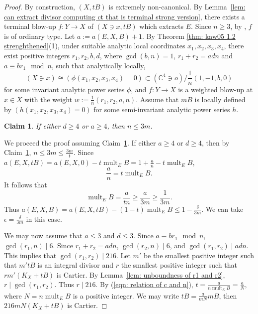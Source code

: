 \documentclass[11pt]{amsart}
\numberwithin{equation}{section}
\newcommand{\mult}{\operatorname{mult}}
\newtheorem{claim}[thm]{Claim}
\theoremstyle{definition}
\theoremstyle{definition}
\begin{document}
\begin{proof}
By construction, $(X,tB)$ is extremely non-canonical. By Lemma~\ref{lem: can extract divisor computing ct that is terminal strong version}, there exists a terminal blow-up $f: Y\to X$ of $(X\ni x,tB)$ which extracts $E$. Since $n\geq 3$, by \cite[Theorem 1.3]{Kaw05}, $f$ is of ordinary type. Let $a:=a(E,X,B)+1$. By Theorem \ref{thm: kaw05 1.2 strenghthened}(1), under suitable analytic local coordinates $x_1,x_2,x_3,x_4$, there exist positive integers $r_1,r_2,b,d$, where $\gcd(b,n)=1$, $r_1+r_2=adn$ and $a\equiv br_1\mod n$, such that analytically locally, $$(X\ni x)\cong (\phi(x_1,x_2,x_3,x_4)=0)\subset (\mathbb C^4\ni o)/\frac{1}{n}(1,-1,b,0)$$
for some invariant analytic power series $\phi$, and $f: Y\to X$ is a weighted blow-up at $x\in X$ with the weight $w:=\frac{1}{n}(r_1,r_2,a,n)$. Assume that $mB$ is locally defined by $(h(x_1,x_2,x_3,x_4)=0)$ for some semi-invariant analytic power series $h$. 



\begin{claim}\label{claim: bound n for extremaly canonical variety}
    If either $d\geq 4$ or $a\geq 4$, then $n\leq 3m$.
\end{claim}

We proceed the proof assuming Claim~\ref{claim: bound n for extremaly canonical variety}. If either $a\geq 4$ or $d\geq 4$, then by Claim~\ref{claim: bound n for extremaly canonical variety}, $n\leq 3m\leq \frac{3m}{t}$. Since $a(E,X,tB)=a(E,X,0)-t\mult_E B=1+\frac{a}{n}-t\mult_E B$,
\begin{equation}\label{eqn: relation of c and n}
    \frac{a}{n}=t\mult_E B.
\end{equation}
It follows that
$$\mult_E B=\frac{a}{tn}\geq \frac{a}{3m}\geq  \frac{1}{3m}.$$ Thus $a(E,X,B)=a(E,X,tB)-(1-t)\mult_E B\leq 1-\frac{\delta}{3m}$. We can take $\epsilon=\frac{\delta}{3m}$ in this case.

\medskip

We may now assume that $a\leq 3$ and $d\leq 3$. Since $a\equiv br_1\mod n$, $\gcd(r_1,n)\mid 6$. Since $r_1+r_2=adn$, $\gcd(r_2,n)\mid 6$, and $\gcd(r_1,r_2)\mid adn$. This implies that $\gcd(r_1,r_2)\mid 216$. Let $m'$ be the smallest positive integer such that $m'tB$ is an integral divisor and $r$ the smallest positive integer such that $rm'(K_X+tB)$ is Cartier. By Lemma~\ref{lem: unboundness of r1 and r2}, $r\mid \gcd(r_1,r_2)$. Thus $r\mid 216$. By (\ref{eqn: relation of c and n}), $t=\frac{a}{n\mult_E B}=\frac{a}{N}$, where $N=n\mult_E B$ is a positive integer. We may write $tB=\frac{a}{mN} mB$, then $216mN(K_X+tB)$ is Cartier.


\end{proof}
\end{document}
